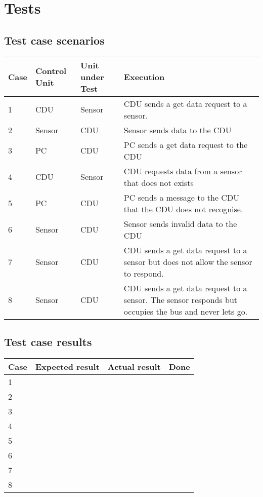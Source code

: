 \chapter{Tests}

\section{Test case scenarios}
\begin{table}[H]
    \begin{tabular}{|l|l|l|p{10cm}|}
    \hline
    Case & Control Unit & Unit under Test & Execution \\ \hline
    1 & CDU & Sensor & CDU sends a get data request to a sensor. \\ \hline
    2 & Sensor & CDU & Sensor sends data to the CDU \\ \hline
    3 & PC & CDU & PC sends a get data request to the CDU \\ \hline
    4 & CDU & Sensor & CDU requests data from a sensor that does not exists \\ \hline
    5 & PC & CDU & PC sends a message to the CDU that the CDU does not recognise. \\ \hline
    6 & Sensor & CDU & Sensor sends invalid data to the CDU \\ \hline
    7 & Sensor & CDU & CDU sends a get data request to a sensor but does not allow the sensor to respond. \\ \hline
    8 & Sensor & CDU & CDU sends a get data request to a sensor. The sensor responds but occupies the bus and never lets go. \\ \hline
    \end{tabular}
\end{table}

\section{Test case results}
\begin{table}[H]
    \begin{tabular}{|l|l|l|p{10cm}|}
    \hline
    Case & Expected result & Actual result & Done \\ \hline
    1 & ~ & ~ & ~\\ \hline
    2 & ~ & ~ & ~\\ \hline
    3 & ~ & ~ & ~\\ \hline
    4 & ~ & ~ & ~\\ \hline
    5 & ~ & ~ & ~\\ \hline
    6 & ~ & ~ & ~\\ \hline
    7 & ~ & ~ & ~\\ \hline
    8 & ~ & ~ & ~\\ \hline
    \end{tabular}
\end{table}